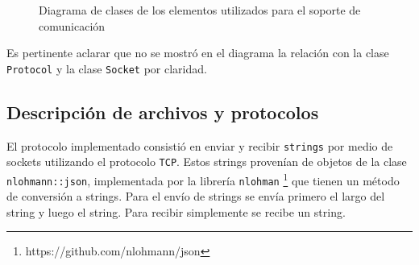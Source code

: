 \documentclass[a4paper]{article}
\begin{document}
\begin{figure}[!h]
	\caption{Diagrama de clases de los elementos utilizados para el soporte de comunicación}
	\label{fig:diagrama5}
\end{figure}

Es pertinente aclarar que no se mostró en el diagrama la relación con la clase \texttt{Protocol} y la clase \texttt{Socket} por claridad.
\newpage

\subsection{Descripción de archivos y protocolos}

El protocolo implementado consistió en enviar y recibir \texttt{strings} por medio de sockets utilizando el protocolo \texttt{TCP}. Estos strings provenían de objetos de la clase \texttt{nlohmann::json}, implementada por la librería \texttt{nlohman} \footnote{https://github.com/nlohmann/json} que tienen un método de conversión a strings. Para el envío de strings se envía primero el largo del string y luego el string. Para recibir simplemente se recibe un string.
\end{document}
